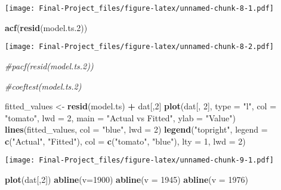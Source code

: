 \documentclass[
]{article}
\newenvironment{Shaded}{\begin{snugshade}}{\end{snugshade}}
\newcommand{\AttributeTok}[1]{\textcolor[rgb]{0.13,0.29,0.53}{#1}}
\newcommand{\CommentTok}[1]{\textcolor[rgb]{0.56,0.35,0.01}{\textit{#1}}}
\newcommand{\DecValTok}[1]{\textcolor[rgb]{0.00,0.00,0.81}{#1}}
\newcommand{\FloatTok}[1]{\textcolor[rgb]{0.00,0.00,0.81}{#1}}
\newcommand{\FunctionTok}[1]{\textcolor[rgb]{0.13,0.29,0.53}{\textbf{#1}}}
\newcommand{\NormalTok}[1]{#1}
\newcommand{\OtherTok}[1]{\textcolor[rgb]{0.56,0.35,0.01}{#1}}
\newcommand{\SpecialCharTok}[1]{\textcolor[rgb]{0.81,0.36,0.00}{\textbf{#1}}}
\newcommand{\StringTok}[1]{\textcolor[rgb]{0.31,0.60,0.02}{#1}}
\begin{document}
\texttt{[image: Final-Project\_files/figure-latex/unnamed-chunk-8-1.pdf]}

\begin{Shaded}
\begin{Highlighting}[]
\FunctionTok{acf}\NormalTok{(}\FunctionTok{resid}\NormalTok{(model.ts}\FloatTok{.2}\NormalTok{))}
\end{Highlighting}
\end{Shaded}

\texttt{[image: Final-Project\_files/figure-latex/unnamed-chunk-8-2.pdf]}

\begin{Shaded}
\begin{Highlighting}[]
\CommentTok{\#pacf(resid(model.ts.2))}

\CommentTok{\#coeftest(model.ts.2)}
\end{Highlighting}
\end{Shaded}

\begin{Shaded}
\begin{Highlighting}[]
\NormalTok{fitted\_values }\OtherTok{\textless{}{-}} \FunctionTok{resid}\NormalTok{(model.ts) }\SpecialCharTok{+}\NormalTok{ dat[,}\DecValTok{2}\NormalTok{]}
\FunctionTok{plot}\NormalTok{(dat[, }\DecValTok{2}\NormalTok{], }\AttributeTok{type =} \StringTok{"l"}\NormalTok{, }\AttributeTok{col =} \StringTok{"tomato"}\NormalTok{, }\AttributeTok{lwd =} \DecValTok{2}\NormalTok{, }\AttributeTok{main =} \StringTok{"Actual vs Fitted"}\NormalTok{, }\AttributeTok{ylab =} \StringTok{"Value"}\NormalTok{)}
\FunctionTok{lines}\NormalTok{(fitted\_values, }\AttributeTok{col =} \StringTok{"blue"}\NormalTok{, }\AttributeTok{lwd =} \DecValTok{2}\NormalTok{)}
\FunctionTok{legend}\NormalTok{(}\StringTok{"topright"}\NormalTok{, }\AttributeTok{legend =} \FunctionTok{c}\NormalTok{(}\StringTok{"Actual"}\NormalTok{, }\StringTok{"Fitted"}\NormalTok{), }\AttributeTok{col =} \FunctionTok{c}\NormalTok{(}\StringTok{"tomato"}\NormalTok{, }\StringTok{"blue"}\NormalTok{), }\AttributeTok{lty =} \DecValTok{1}\NormalTok{, }\AttributeTok{lwd =} \DecValTok{2}\NormalTok{)}
\end{Highlighting}
\end{Shaded}

\texttt{[image: Final-Project\_files/figure-latex/unnamed-chunk-9-1.pdf]}

\begin{Shaded}
\begin{Highlighting}[]
\FunctionTok{plot}\NormalTok{(dat[,}\DecValTok{2}\NormalTok{])}
\FunctionTok{abline}\NormalTok{(}\AttributeTok{v=}\DecValTok{1900}\NormalTok{)}
\FunctionTok{abline}\NormalTok{(}\AttributeTok{v =} \DecValTok{1945}\NormalTok{)}
\FunctionTok{abline}\NormalTok{(}\AttributeTok{v =} \DecValTok{1976}\NormalTok{)}
\end{Highlighting}
\end{Shaded}
\end{document}
